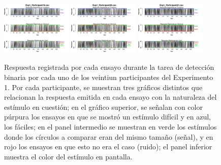 \begin{figure}[th]
\includegraphics[width=0.30\textwidth]{Figures/BiasResp_Exp1_P19} \includegraphics[width=0.30\textwidth]{Figures/BiasResp_Exp1_P20} \includegraphics[width=0.30\textwidth]{Figures/BiasResp_Exp1_P21}
\caption[Sesgo al Responder _Ex1]{Respuesta registrada por cada ensayo durante la tarea de detección binaria por cada uno de los veintiun participantes del Experimento 1. Por cada participante, se muestran tres gráficos distintos que relacionan la respuesta emitida en cada ensayo con la naturaleza del estímulo en cuestión; en el gráfico superior, se señalan con color púrpura los ensayos en que se mostró un estímulo difícil y en azul, los fáciles; en el panel intermedio se muestran en verde los estímulos donde los círculos a comparar eran del mismo tamaño (señal), y en rojo los ensayos en que esto no era el caso (ruido); el panel inferior muestra el color del estímulo en pantalla.}
\label{fig:BiasResp_E1}
\end{figure}

